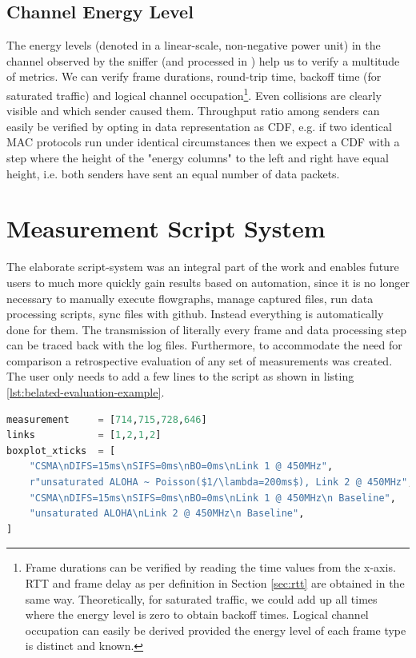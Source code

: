 \subsection{Channel Energy Level}

The energy levels (denoted in a linear-scale, non-negative power unit) in the channel observed by the sniffer (and processed in ) help us to verify a multitude of metrics. We can verify frame durations, round-trip time, backoff time (for saturated traffic) and logical channel occupation\footnote{Frame durations can be verified by reading the time values from the x-axis. RTT and frame delay as per definition in Section \ref{sec:rtt} are obtained in the same way. Theoretically, for saturated traffic, we could add up all times where the energy level is zero to obtain backoff times. Logical channel occupation can easily be derived provided the energy level of each frame type is distinct and known.}. Even collisions are clearly visible and which sender caused them. Throughput ratio among senders can easily be verified by opting in data representation as CDF, e.g. if two identical MAC protocols run under identical circumstances then we expect a CDF with a step where the height of the "energy columns" to the left and right have equal height, i.e. both senders have sent an equal number of data packets.

\section{Measurement Script System}
\label{sec:script-system}

The elaborate script-system was an integral part of the work and enables future users to much more quickly gain results based on automation, since it is no longer necessary to manually execute flowgraphs, manage captured files, run data processing scripts, sync files with github. Instead everything is automatically done for them. The transmission of literally every frame and data processing step can be traced back with the log files. Furthermore, to accommodate the need for comparison a retrospective evaluation of any set of measurements  was created. The user only needs to add a few lines to the script as shown in listing \ref{lst:belated-evaluation-example}.
  
\begin{lstlisting}[language=Python,caption=Evaluation of measurements with \code{belated\_evaluation.py}. In \code{links} we denote the link we used in the corresponding measurement (compare Figure \ref{fig:measurement-setup}).,label=lst:belated-evaluation-example]
measurement     = [714,715,728,646]
links           = [1,2,1,2]
boxplot_xticks  = [
	"CSMA\nDIFS=15ms\nSIFS=0ms\nBO=0ms\nLink 1 @ 450MHz",
    r"unsaturated ALOHA ~ Poisson($1/\lambda=200ms$), Link 2 @ 450MHz",
    "CSMA\nDIFS=15ms\nSIFS=0ms\nBO=0ms\nLink 1 @ 450MHz\n Baseline",
    "unsaturated ALOHA\nLink 2 @ 450MHz\n Baseline",
]
\end{lstlisting}

